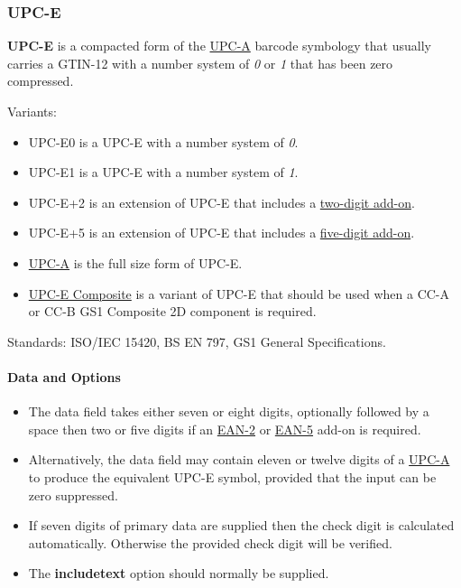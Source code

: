 \hypertarget{upc-e}{%
\subsubsection{UPC-E}\label{upc-e}}

\textbf{UPC-E} is a compacted form of the
\protect\hyperlink{upc-a}{UPC-A} barcode symbology that usually carries
a GTIN-12 with a number system of \emph{0} or \emph{1} that has been
zero compressed.

Variants:

\begin{itemize}
\tightlist
\item
  UPC-E0 is a UPC-E with a number system of \emph{0}.
\item
  UPC-E1 is a UPC-E with a number system of \emph{1}.
\item
  UPC-E+2 is an extension of UPC-E that includes a
  \protect\hyperlink{ean-2}{two-digit add-on}.
\item
  UPC-E+5 is an extension of UPC-E that includes a
  \protect\hyperlink{ean-5}{five-digit add-on}.
\item
  \protect\hyperlink{upc-a}{UPC-A} is the full size form of UPC-E.
\item
  \protect\hyperlink{gs1-composite-symbols}{UPC-E Composite} is a
  variant of UPC-E that should be used when a CC-A or CC-B GS1 Composite
  2D component is required.
\end{itemize}

Standards: ISO/IEC 15420, BS EN 797, GS1 General Specifications.

\hypertarget{data-and-options-3}{%
\paragraph{Data and Options}\label{data-and-options-3}}

\begin{itemize}
\tightlist
\item
  The data field takes either seven or eight digits, optionally followed
  by a space then two or five digits if an
  \protect\hyperlink{ean-2}{EAN-2} or \protect\hyperlink{ean-5}{EAN-5}
  add-on is required.
\item
  Alternatively, the data field may contain eleven or twelve digits of a
  \protect\hyperlink{upc-a}{UPC-A} to produce the equivalent UPC-E
  symbol, provided that the input can be zero suppressed.
\item
  If seven digits of primary data are supplied then the check digit is
  calculated automatically. Otherwise the provided check digit will be
  verified.
\item
  The \textbf{includetext} option should normally be supplied.
\end{itemize}

